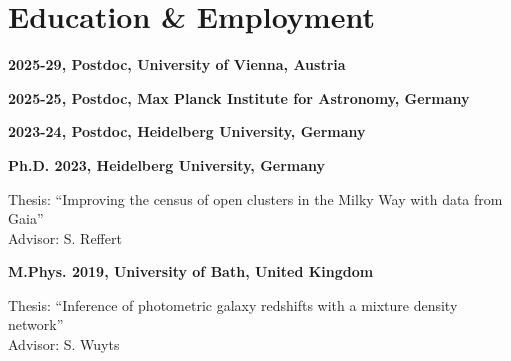 \section*{Education \& Employment}

\textbf{2025-29, Postdoc, University of Vienna, Austria}
\vspace{0.2cm}

\textbf{2025-25, Postdoc, Max Planck Institute for Astronomy, Germany}
\vspace{0.2cm}

\textbf{2023-24, Postdoc, Heidelberg University, Germany}
\vspace{0.2cm}

\textbf{Ph.D. 2023, Heidelberg University, Germany}
\begin{addmargin}[2em]{0em}
    Thesis: ``Improving the census of open clusters in the Milky Way with data from Gaia''\\
    Advisor: S. Reffert
\end{addmargin}
\vspace{0.2cm}

\textbf{M.Phys. 2019, University of Bath, United Kingdom}
\begin{addmargin}[2em]{0em}
    Thesis: ``Inference of photometric galaxy redshifts with a mixture density network''\\
    Advisor: S. Wuyts
\end{addmargin}